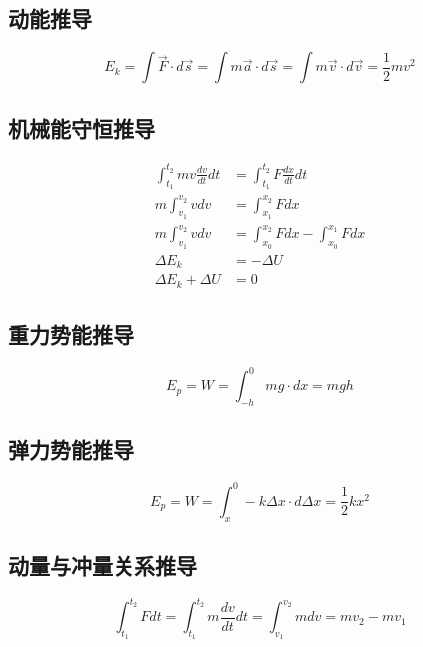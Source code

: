 \subsection{动能推导}

\begin{equation*}
    E_k=\int\vec{F}\cdot d\vec{s}
        =\int m\vec{a}\cdot d\vec{s}
        =\int m\vec{v}\cdot d\vec{v}
        =\frac12mv^2
\end{equation*}

\subsection{机械能守恒推导}

\begin{align*}
    \int_{t_1}^{t_2}mv\frac{dv}{dt}dt&=\int_{t_1}^{t_2}F\frac{dx}{dt}dt\\
    m\int_{v_1}^{v_2}vdv&=\int_{x_1}^{x_2}Fdx\\
    m\int_{v_1}^{v_2}vdv&=\int_{x_0}^{x_2}Fdx-\int_{x_0}^{x_1}Fdx\\
    \Delta E_k&=-\Delta U\\
    \Delta E_k+\Delta U&=0
\end{align*}

\subsection{重力势能推导}

\begin{equation*}
    E_p=W=\int_{-h}^0mg\cdot dx=mgh
\end{equation*}

\subsection{弹力势能推导}

\begin{equation*}
    E_p=W=\int_{x}^0-k\Delta x\cdot d\Delta x=\frac12kx^2
\end{equation*}

\subsection{动量与冲量关系推导}

\begin{equation*}
    \int_{t_1}^{t_2}Fdt
    =\int_{t_1}^{t_2}m\frac{dv}{dt}dt
    =\int_{v_1}^{v_2}mdv
    =mv_2-mv_1
\end{equation*}

